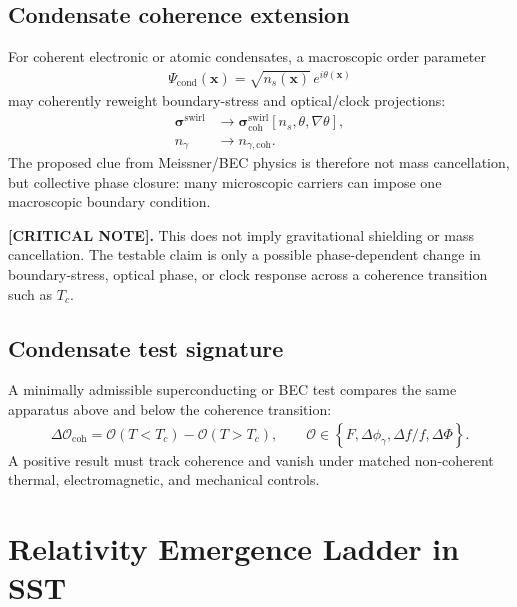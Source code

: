 \subsection{Condensate coherence extension}

For coherent electronic or atomic condensates, a macroscopic order parameter
\begin{align}
    \Psi_{\mathrm{cond}}(\mathbf{x})
    =
    \sqrt{n_s(\mathbf{x})}\,e^{i\theta(\mathbf{x})}
    \label{eq:rt_condensate_order_parameter}
\end{align}
may coherently reweight boundary-stress and optical/clock projections:
\begin{align}
    \boldsymbol{\sigma}^{\mathrm{swirl}}
    &\rightarrow
    \boldsymbol{\sigma}^{\mathrm{swirl}}_{\mathrm{coh}}[n_s,\theta,\nabla\theta],
    \\
    n_\gamma
    &\rightarrow
    n_{\gamma,\mathrm{coh}}.
    \label{eq:rt_condensate_projection_reweighting}
\end{align}
The proposed clue from Meissner/BEC physics is therefore not mass cancellation,
but collective phase closure: many microscopic carriers can impose one
macroscopic boundary condition.

\textbf{[CRITICAL NOTE].}
This does not imply gravitational shielding or mass cancellation. The testable
claim is only a possible phase-dependent change in boundary-stress, optical
phase, or clock response across a coherence transition such as \(T_c\).

\subsection{Condensate test signature}

A minimally admissible superconducting or BEC test compares the same apparatus
above and below the coherence transition:
\begin{align}
    \Delta\mathcal{O}_{\mathrm{coh}}
    =
    \mathcal{O}(T<T_c)-\mathcal{O}(T>T_c),
    \qquad
    \mathcal{O}
    \in
    \left\{
    F,
    \Delta\phi_\gamma,
    \Delta f/f,
    \Delta\Phi
    \right\}.
    \label{eq:rt_condensate_test_signature}
\end{align}
A positive result must track coherence and vanish under matched non-coherent
thermal, electromagnetic, and mechanical controls.

\section{Relativity Emergence Ladder in SST}
\label{sec:rt_relativity_emergence_ladder}

